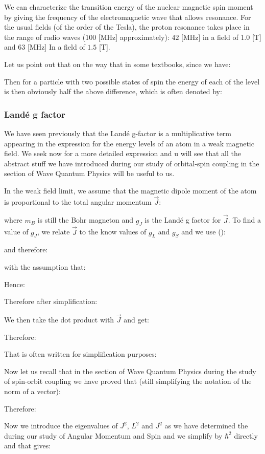 	We can characterize the transition energy of the nuclear magnetic spin moment by giving the frequency of the electromagnetic wave that allows resonance. For the usual fields (of the order of the Tesla), the proton resonance takes place in the range of radio waves ($100$ [MHz] approximately): $42$ [MHz] in a field of $1.0$ [T] and $63$ [MHz] In a field of $1.5$ [T].
	
	Let us point out that on the way that in some textbooks, since we have:
	
	Then for a particle with two possible states of spin the energy of each of the level is then obviously half the above difference, which is often denoted by:
	
	
	\subsubsection{Landé g factor}
	We have seen previously that the Landé g-factor is a multiplicative term appearing in the expression for the energy levels of an atom in a weak magnetic field. We seek now for a more detailed expression and u will see that all the abstract stuff we have introduced during our study of orbital-spin coupling in the section of Wave Quantum Physics will be useful to us.
	
	In the weak field limit, we assume that the magnetic dipole moment of the atom is proportional to the total angular momentum $\vec{J}$:
	
	where $m_B$ is still the Bohr magneton and $g_J$ is the Landé g factor for $\vec{J}$. To find a value of $g_J$, we relate $\vec{J}$ to the know values of $g_L$ and $g_S$ and we use ():
	
	and therefore:
	
	with the assumption that:
	
	Hence:
	
	Therefore after simplification:
	
	We then take the dot product with $\vec{J}$ and get:
	
	Therefore:
	
	That is often written for simplification purposes:
	
	Now let us recall that in the section of Wave Quantum Physics during the study of spin-orbit coupling we have proved that (still simplifying the notation of the norm of a vector):
	
	Therefore:
	
	Now we introduce the eigenvalues of $J^2$, $L^2$ and $J^2$ as we have determined the during our study of Angular Momentum and Spin and we simplify by $\hbar^2$ directly and that gives:
	
